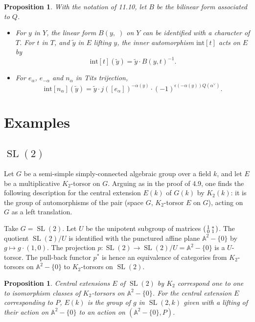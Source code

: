 \documentclass[11pt,a4paper]{article}
\theoremstyle{plain}
\newtheorem{proposition}[theorem]{Proposition}
\theoremstyle{definition}
\newcommand{\bA}{\mathbb{A}}
\DeclareMathOperator{\SL}{SL}
\newcommand{\intg}{\mathrm{int}}
\begin{document}
\begin{proposition}\label{prop:11.11}
With the notation of 11.10, let $B$ be the bilinear form associated to $Q$.
\begin{itemize}
\item[(i)] For $y$ in $Y$, the linear form $B(y, \;)$ on $Y$ can be identified with a character of $T$. For $t$ in $T$, and $\tilde{y}$ in $E$ lifting $y$, the inner automorphism $\intg[t]$ acts on $E$ by
\begin{equation}\label{eq:11.11.1}
\intg[t](\tilde{y}) = \tilde{y} \cdot B(y, t)^{-1}.
\end{equation}
\item[(ii)] For $e_\alpha$, $e_{-\alpha}$ and $n_\alpha$ in Tits trijection,
\begin{equation}\label{eq:11.11.2}
\intg[n_\alpha](\tilde{y}) = \tilde{y} \cdot j([e_\alpha])^{-\alpha(y)} \cdot (-1)^{\epsilon(-\alpha(y)) Q(\alpha^\vee)}.
\end{equation}
\end{itemize}
\end{proposition}

\section{Examples}

\subsection{$\SL(2)$}
Let $G$ be a semi-simple simply-connected algebraic group over a field $k$, and let $E$ be a multiplicative $K_2$-torsor on $G$. Arguing as in the proof of 4.9, one finds the following description for the central extension $E(k)$ of $G(k)$ by $K_2(k)$: it is the group of automorphisms of the pair (space $G$, $K_2$-torsor $E$ on $G$), acting on $G$ as a left translation.

Take $G = \SL(2)$. Let $U$ be the unipotent subgroup of matrices $\begin{psmallmatrix} 1 & * \\ 0 & 1 \end{psmallmatrix}$. The quotient $\SL(2)/U$ is identified with the punctured affine plane $\bA^2 - \{0\}$ by $g \mapsto g \cdot (1,0)$. The projection $p: \SL(2) \to \SL(2)/U = \bA^2 - \{0\}$ is a $U$-torsor. The pull-back functor $p^*$ is hence an equivalence of categories from $K_2$-torsors on $\bA^2 - \{0\}$ to $K_2$-torsors on $\SL(2)$.

\begin{proposition}\label{prop:12.2}
Central extensions $E$ of $\SL(2)$ by $K_2$ correspond one to one to isomorphism classes of $K_2$-torsors on $\bA^2 - \{0\}$. For the central extension $E$ corresponding to $P$, $E(k)$ is the group of $g$ in $\SL(2,k)$ given with a lifting of their action on $\bA^2 - \{0\}$ to an action on $(\bA^2 - \{0\}, P)$.
\end{proposition}
\end{document}
